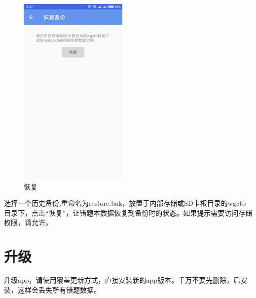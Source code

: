 \begin{figure}[H]
	\centering
	\includegraphics{img/3.jpg}
	\caption{恢复}
	\label{img3}
\end{figure}

选择一个历史备份,重命名为restore.bak，放置于内部存储或SD卡根目录的wgctb目录下，点击“恢复”，让错题本数据恢复到备份时的状态。如果提示需要访问存储权限，请允许。

\section{升级}
升级app，请使用覆盖更新方式，直接安装新的app版本。千万不要先删除，后安装，这样会丢失所有错题数据。